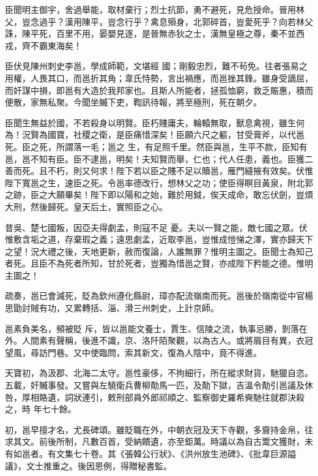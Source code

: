 \begin{pinyinscope}
 臣聞明主御宇，舍過舉能，取材棄行；烈士抗節，勇不避死，見危授命。晉用林父，豈念過乎？漢用陳平，豈念行乎？禽息殞身，北郭碎首，豈愛死乎？向若林父誅，陳平死，百里不用，晏嬰見逐，是晉無赤狄之士，漢無皇極之尊，秦不並西戎，齊不霸東海矣！



 臣伏見陳州刺史李邕，學成師範，文堪經
 國；剛毅忠烈，難不茍免。往者張易之用權，人畏其口，而邕折其角；韋氏恃勢，言出禍應，而邕挫其鋒。雖身受謫屈，而奸謀中損，即邕有大造於我邦家也。且斯人所能者，拯孤恤窮，救乏賑惠，積而便散，家無私聚。今聞坐贓下吏，鞫訊待報，將至極刑，死在朝夕。



 臣聞生無益於國，不若殺身以明賢。臣朽賤庸夫，輪轅無取，獸息禽視，雖生何為！況賢為國寶，社稷之衛，是臣痛惜深矣！臣願六尺之軀，甘受膏斧，以代邕死。臣之死，所謂落一毛；邕之
 生，有足照千里。然臣與邕，生平不款，臣知有邕，邕不知有臣。臣不逮邕，明矣！夫知賢而舉，仁也；代人任患，義也。臣獲二善而死。且不朽，則又何求！陛下若以臣之賤不足以贖邕，雁門縫掖有效矣。伏惟陛下寬邕之生，速臣之死。令邕率德改行，想林父之功；使臣得瞑目黃泉，附北郭之跡，臣之大願畢矣！陛下即以陽和之始，難於用鉞，俟天成命，敢忘伏劍，豈煩大刑，然後歸死。皇天后土，實照臣之心。



 昔吳、楚七國叛，因亞夫得劇孟，則寇不足
 憂。夫以一賢之能，敵七國之眾。伏惟敷含垢之道，存棄瑕之義；遠思劇孟，近取李邕，豈惟成愷悌之澤，實亦歸天下之望！況大禮之後，天地更新，赦而復論，人誰無罪？惟明主圖之。臣聞士為知己者死。且臣不為死者所知，甘於死者，豈獨為惜邕之賢，亦成陛下矜能之德。惟明主圖之！



 疏奏，邕已會減死，貶為欽州遵化縣尉，璋亦配流嶺南而死。邕後於嶺南從中官楊思勖討賊有功，又累轉括、淄、滑三州刺史，上計京師。



 邕素負美名，頻被貶
 斥，皆以邕能文養士，賈生、信陵之流，執事忌勝，剝落在外。人間素有聲稱，後進不識，京、洛阡陌聚觀，以為古人。或將眉目有異，衣冠望風，尋訪門巷。又中使臨問，索其新文，復為人陰中，竟不得進。



 天寶初，為汲郡、北海二太守。邕性豪侈，不拘細行，所在縱求財貨，馳獵自恣。五載，奸贓事發。又嘗與左驍衛兵曹柳勣馬一匹，及勣下獄，吉溫令勣引邕議及休咎，厚相賂遺，詞狀連引，敕刑部員外郎祁順之、監察御史羅希奭馳往就郡決殺之，時
 年七十餘。



 初，邕早擅才名，尤長碑頌。雖貶職在外，中朝衣冠及天下寺觀，多齎持金帛，往求其文。前後所制，凡數百首，受納饋遺，亦至鉅萬。時議以為自古鬻文獲財，未有如邕者。有文集七十卷。其《張韓公行狀》、《洪州放生池碑》、《批韋巨源謚議》，文士推重之。後因恩例，得贈秘書監。




\end{pinyinscope}
